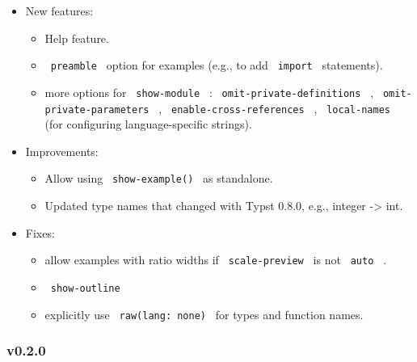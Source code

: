 \begin{itemize}
\tightlist
\item
  New features:

  \begin{itemize}
  \tightlist
  \item
    Help feature.
  \item
    \texttt{\ preamble\ } option for examples (e.g., to add
    \texttt{\ import\ } statements).
  \item
    more options for \texttt{\ show-module\ } :
    \texttt{\ omit-private-definitions\ } ,
    \texttt{\ omit-private-parameters\ } ,
    \texttt{\ enable-cross-references\ } , \texttt{\ local-names\ } (for
    configuring language-specific strings).
  \end{itemize}
\item
  Improvements:

  \begin{itemize}
  \tightlist
  \item
    Allow using \texttt{\ show-example()\ } as standalone.
  \item
    Updated type names that changed with Typst 0.8.0, e.g., integer
    -\textgreater{} int.
  \end{itemize}
\item
  Fixes:

  \begin{itemize}
  \tightlist
  \item
    allow examples with ratio widths if \texttt{\ scale-preview\ } is
    not \texttt{\ auto\ } .
  \item
    \texttt{\ show-outline\ }
  \item
    explicitly use \texttt{\ raw(lang:\ none)\ } for types and function
    names.
  \end{itemize}
\end{itemize}

\subsubsection{v0.2.0}\label{v0.2.0}

